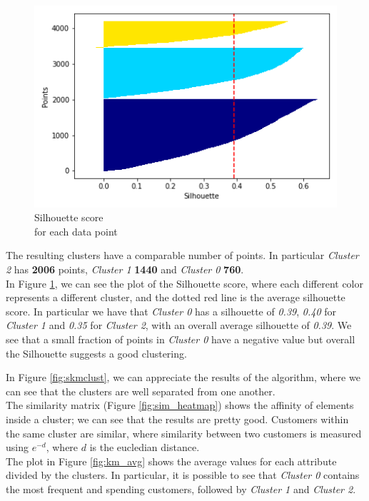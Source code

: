 \begin{figure}
    \vspace{-5mm}
    \centering
    \captionsetup{justification=centering}
    \includegraphics[width=.4\textwidth]{img/clustering/sil_tot.png}
    \caption{Silhouette score\\ for each data point}
    \label{fig:silhouette}
\end{figure}

The resulting clusters have a comparable number of points. In particular \emph{Cluster 2} has \textbf{2006} points, \emph{Cluster 1} \textbf{1440} and \emph{Cluster 0} \textbf{760}.\\
In Figure \ref{fig:silhouette}, we can see the plot of the Silhouette score, where each different color represents a different cluster, and the dotted red line is the average silhouette score. In particular we have that \emph{Cluster 0} has a silhouette of \emph{0.39}, \emph{0.40} for \emph{Cluster 1} and \emph{0.35} for \emph{Cluster 2}, with an overall average silhouette of \emph{0.39}. We see that a small fraction of points in \emph{Cluster 0} have a negative value but overall the Silhouette suggests a good clustering.

In Figure \ref{fig:skmclust}, we can appreciate the results of the algorithm, where we can see that the clusters are well separated from one another.\\
The similarity matrix (Figure \ref{fig:sim_heatmap}) shows the affinity of elements inside a cluster; we can see that the results are pretty good. Customers within the same cluster are similar, where similarity between two customers is measured using $e^{-d}$, where $d$ is the eucledian distance.\\
The plot in Figure \ref{fig:km_avg} shows the average values for each attribute divided by the clusters. In particular, it is possible to see that \emph{Cluster 0} contains the most frequent and spending customers, followed by \emph{Cluster 1} and \emph{Cluster 2}.

